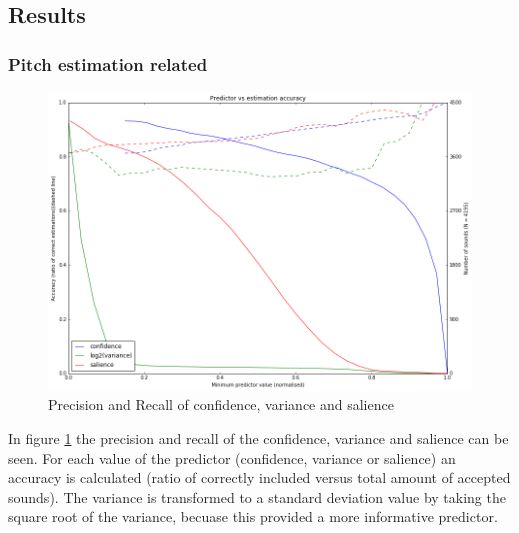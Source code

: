 \documentclass{article}
\begin{document}
\subsection{Results}
\subsubsection{Pitch estimation related}
\begin{figure}
    \centering
    \includegraphics[scale=0.5]{img/penr_cvs.png}
    \caption{Precision and Recall of confidence, variance and salience}
    \label{fig:penr_cvs}
\end{figure}
In figure \ref{fig:penr_cvs} the precision and recall of the confidence, variance and salience can be seen. For each value of the predictor (confidence, variance or salience) an accuracy is calculated (ratio of correctly included versus total amount of accepted sounds). The variance is transformed to a standard deviation value by taking the square root of the variance, becuase this provided a more informative predictor.
\end{document}
